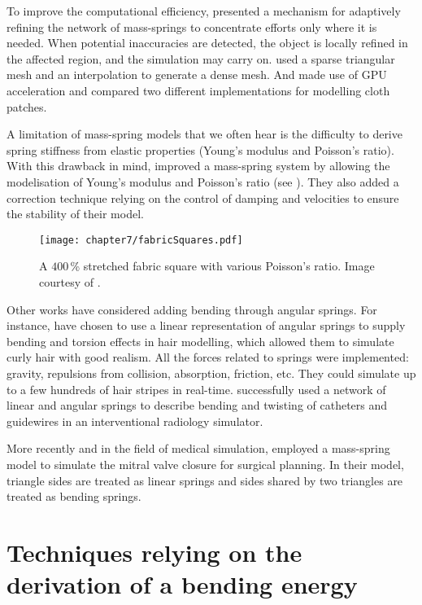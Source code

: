 To improve the computational efficiency, \cite{Hutchinson96} presented a mechanism for adaptively refining the network of mass-springs to concentrate efforts only where it is needed. When potential inaccuracies are detected, the object is locally refined in the affected region, and the simulation may carry on. \cite{Oshita01} used a sparse triangular mesh and an interpolation to generate a dense mesh. And \cite{Georgii05} made use of GPU acceleration and compared two different implementations for modelling cloth patches.

A limitation of mass-spring models that we often hear is the difficulty to derive spring stiffness from elastic properties (Young's modulus and Poisson's ratio). With this drawback in mind, \cite{Volino97} improved a mass-spring system by allowing the modelisation of Young's modulus and Poisson's ratio (see ). They also added a correction technique relying on the control of damping and velocities to ensure the stability of their model. 
%
\begin{figure}[ht]
\begin{center}
\texttt{[image: chapter7/fabricSquares.pdf]}
\caption[A $400\,$\% stretched fabric square]{A $400\,$\% stretched fabric square with various Poisson's ratio. Image courtesy of \cite{Volino97}.}
\label{chap7:fig-fabricSquares}
\end{center}
\end{figure}

Other works have considered adding bending through angular springs. For instance, \cite{Taskiran05} have chosen to use a linear representation of angular springs to supply bending and torsion effects in hair modelling, which allowed them to simulate curly hair with good realism. All the forces related to springs were implemented: gravity, repulsions from collision, absorption, friction, etc. They could simulate up to a few hundreds of hair stripes in real-time. \cite{Wang07} successfully used a network of linear and angular springs to describe bending and twisting of catheters and guidewires in an interventional radiology simulator. 

More recently and in the field of medical simulation, \cite{Hammer08} employed a mass-spring model to simulate the mitral valve closure for surgical planning. In their model, triangle sides are treated as linear springs and sides shared by two triangles are treated as bending springs. 

	
\section{Techniques relying on the derivation of a bending energy}

